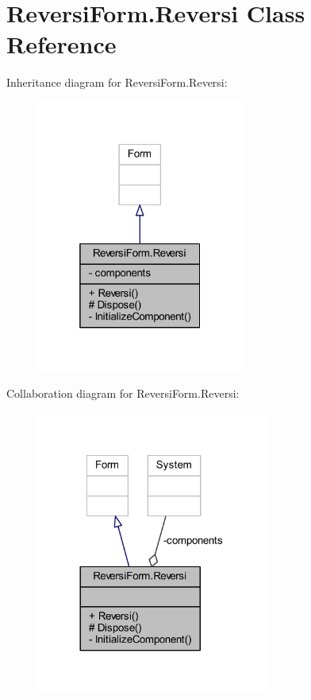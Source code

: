 \hypertarget{class_reversi_form_1_1_reversi}{}\section{Reversi\+Form.\+Reversi Class Reference}
\label{class_reversi_form_1_1_reversi}


Inheritance diagram for Reversi\+Form.\+Reversi\+:
\nopagebreak
\begin{figure}[H]
\begin{center}
\leavevmode
\includegraphics[width=193pt]{class_reversi_form_1_1_reversi__inherit__graph}
\end{center}
\end{figure}


Collaboration diagram for Reversi\+Form.\+Reversi\+:
\nopagebreak
\begin{figure}[H]
\begin{center}
\leavevmode
\includegraphics[width=216pt]{class_reversi_form_1_1_reversi__coll__graph}
\end{center}
\end{figure}

